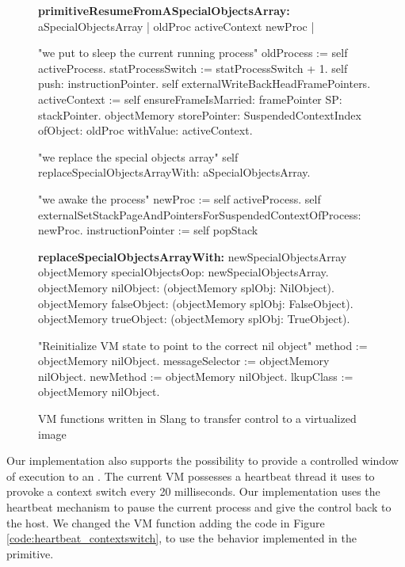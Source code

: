 \begin{figure}[htb]
\begin{code}
\textbf{primitiveResumeFromASpecialObjectsArray:}
                                                        aSpecialObjectsArray
    | oldProc activeContext  newProc |

    "we put to sleep the current running process"
    oldProcess := self activeProcess.
    statProcessSwitch := statProcessSwitch + 1.
    self push: instructionPointer.
    self externalWriteBackHeadFramePointers.
    activeContext := self
        ensureFrameIsMarried: framePointer
        SP: stackPointer.
    objectMemory
        storePointer: SuspendedContextIndex
        ofObject: oldProc
        withValue: activeContext.
	
    "we replace the special objects array"
    self replaceSpecialObjectsArrayWith: aSpecialObjectsArray.
	
    "we awake the process"
    newProc := self activeProcess.
    self externalSetStackPageAndPointersForSuspendedContextOfProcess: newProc.
    instructionPointer := self popStack

\textbf{replaceSpecialObjectsArrayWith:} newSpecialObjectsArray
    objectMemory specialObjectsOop: newSpecialObjectsArray.
    objectMemory nilObject:
             (objectMemory splObj: NilObject).
    objectMemory falseObject: 
             (objectMemory splObj: FalseObject).
    objectMemory trueObject:
             (objectMemory splObj: TrueObject).

    "Reinitialize VM state to point to the correct nil object"	
    method := objectMemory nilObject.
    messageSelector := objectMemory nilObject.
    newMethod := objectMemory nilObject.
    lkupClass := objectMemory nilObject.
\end{code}
\caption{VM functions written in Slang to transfer control to a virtualized image
\label{code:switch_to_objectspace}}
\end{figure}

Our implementation also supports the possibility to provide a controlled window of execution to an \objectspace. The current VM possesses a heartbeat thread it uses to provoke a context switch every 20 milliseconds. Our implementation uses the heartbeat mechanism to pause the current \objectspace process and give the control back to the host. We changed the VM function \textbf{} adding the code in Figure \ref{code:heartbeat_contextswitch}, to use the behavior implemented in the  primitive.

